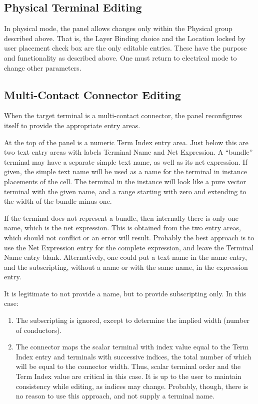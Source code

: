 \subsection{Physical Terminal Editing}

In physical mode, the panel allows changes only within the {\cb
Physical} group described above.  That is, the {\cb Layer Binding}
choice and the {\cb Location locked by user placement} check box are
the only editable entries.  These have the purpose and functionality
as described above.  One must return to electrical mode to change
other parameters.

\subsection{Multi-Contact Connector Editing}

When the target terminal is a multi-contact connector, the
panel reconfigures itself to provide the appropriate entry areas. 

At the top of the panel is a numeric {\cb Term Index} entry area. 
Just below this are two text entry areas with labels {\cb Terminal
Name} and {\cb Net Expression}.  A ``bundle'' terminal may have a
separate simple text name, as well as its net expression.  If given,
the simple text name will be used as a name for the terminal in
instance placements of the cell.  The terminal in the instance will
look like a pure vector terminal with the given name, and a range
starting with zero and extending to the width of the bundle minus one.

If the terminal does not represent a bundle, then internally there is
only one name, which is the net expression.  This is obtained from the
two entry areas, which should not conflict or an error will result. 
Probably the best approach is to use the {\cb Net Expression} entry
for the complete expression, and leave the {\cb Terminal Name} entry
blank.  Alternatively, one could put a text name in the name entry,
and the subscripting, without a name or with the same name, in the
expression entry.

It is legitimate to not provide a name, but to provide subscripting
only.  In this case:

\begin{enumerate}
\item{The subscripting is ignored, except to determine the implied
width (number of conductors).}

\item{The connector maps the scalar terminal with index value equal to
the {\cb Term Index} entry and terminals with successive indices, the
total number of which will be equal to the connector width.  Thus,
scalar terminal order and the {\cb Term Index} value are critical in
this case.  It is up to the user to maintain consistency while
editing, as indices may change.  Probably, though, there is no reason
to use this approach, and not supply a terminal name.}
\end{enumerate}

